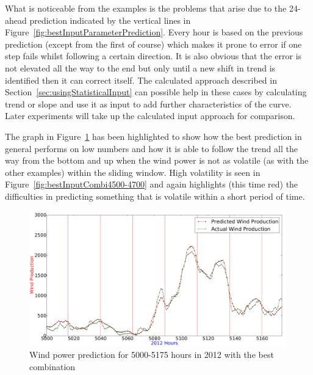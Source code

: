 What is noticeable from the examples is the problems that arise due to the 24-ahead prediction indicated by the vertical lines in Figure~\ref{fig:bestInputParameterPrediction}. Every hour is based on the previous prediction (except from the first of course) which makes it prone to error if one step fails whilst following a certain direction. It is also obvious that the error is not elevated all the way to the end but only until a new shift in trend is identified then it can correct itself. The calculated approach described in Section~\ref{sec:usingStatisticalInput} can possible help in these cases by calculating trend or slope and use it as input to add further characteristics of the curve. Later experiments will take up the calculated input approach for comparison.

The graph in Figure~\ref{fig:bestInputParameterLowNumbers} has been highlighted to show how the best prediction in general performs on low numbers and how it is able to follow the trend all the way from the bottom and up when the wind power is not as volatile (as with the other examples) within the sliding window. High volatility is seen in Figure~\ref{fig:bestInputCombi4500-4700} and again highlights (this time red) the difficulties in predicting something that is volatile within a short period of time.

\begin{figure}[H]
\centering
\includegraphics[width=0.99\textwidth]{billeder/bestInputParameterLowNumbers.png}
\caption{Wind power prediction for 5000-5175 hours in 2012 with the best combination}
\label{fig:bestInputParameterLowNumbers}
\end{figure} 

